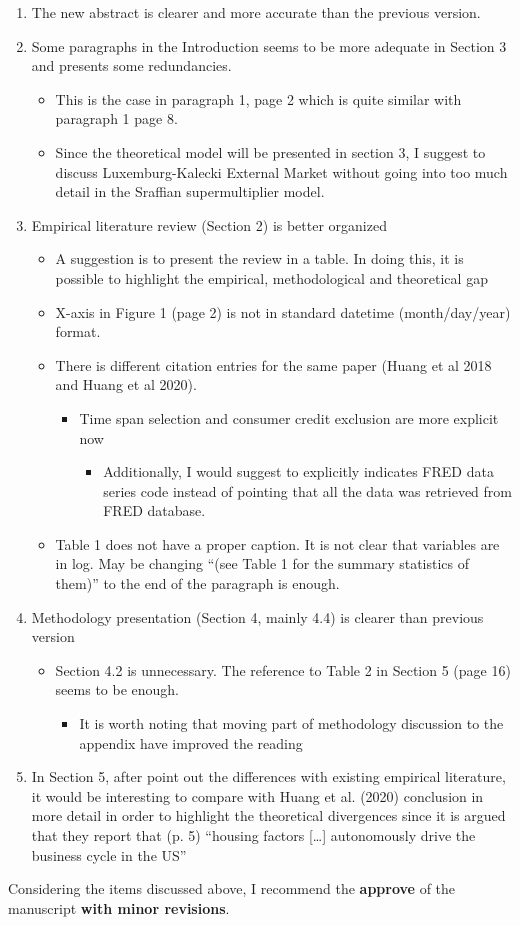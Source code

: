 \documentclass[11pt]{article}
\begin{document}
\begin{enumerate}
\item The new abstract is clearer and more accurate than the previous version.
\item Some paragraphs in the Introduction seems to be more adequate in Section 3 and presents some redundancies.
\begin{itemize}
\item This is the case in paragraph 1, page 2 which is quite similar with paragraph 1 page 8.
\item Since the theoretical model will be presented in section 3, I suggest to discuss Luxemburg-Kalecki External Market without going into too much detail in the Sraffian supermultiplier model.
\end{itemize}
\item Empirical literature review (Section 2) is better organized
\begin{itemize}
\item A suggestion is to present the review in a table. In doing this, it is possible to highlight the empirical, methodological and theoretical gap
\item X-axis in Figure 1 (page 2) is not in standard datetime (month/day/year) format.
\item There is different citation entries for the same paper (Huang et al 2018 and Huang et al 2020).
\begin{itemize}
\item Time span selection and consumer credit exclusion are more explicit now
\begin{itemize}
\item Additionally, I would suggest to explicitly indicates FRED data series code instead of pointing that all the data was retrieved from FRED database.
\end{itemize}
\end{itemize}
\item Table 1 does not have a proper caption. It is not clear that variables are in log. May be changing ``(see Table 1 for the summary statistics of them)'' to the end of the paragraph is enough.
\end{itemize}
\item Methodology presentation (Section 4, mainly 4.4) is clearer than previous version
\begin{itemize}
\item Section 4.2 is unnecessary. The reference to Table 2 in Section 5 (page 16) seems to be enough.
\begin{itemize}
\item It is worth noting that moving part of methodology discussion to the appendix have improved the reading
\end{itemize}
\end{itemize}
\item In Section 5, after point out the differences with existing empirical literature, it would be interesting to compare with Huang et al. (2020) conclusion in more detail in order to highlight the theoretical divergences since it is argued that they report that (p. 5) ``housing factors [\ldots{}]   autonomously drive the business cycle in the US''
\end{enumerate}

Considering the items discussed above, I recommend the \textbf{approve} of the manuscript \textbf{with minor revisions}.
\end{document}
